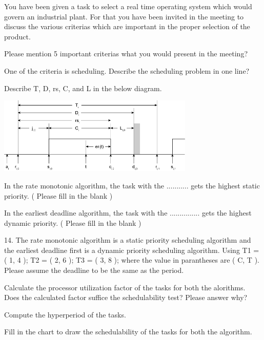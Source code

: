 \pagebreak


You have been given a task to select a real time operating system which would govern an industrial plant. For that you have been invited in the meeting to discuss the various criterias which are important in the proper selection of the product. 

\begin{unteraufgaben}

\item Please mention 5 important criterias what you would present in the meeting?

\item One of the criteria is scheduling. Describe the scheduling problem in one line?

\item Describe T, D, rs, C, and L in the below diagram.

\includegraphics[width=0.7\textwidth]{master-exam-2014/figure1}
 
\item In the rate monotonic algorithm, the task with the ........... gets the highest static priority. ( Please fill in the blank )

\item In the earliest deadline algorithm, the task with the ............... gets the highest dynamic priority. ( Please fill in the blank )

\end{unteraufgaben}

\pagebreak



14.	The rate monotonic algorithm is a static priority scheduling algorithm and the earliest deadline first is a dynamic priority scheduling algorithm. Using T1 = ( 1, 4 ); T2 = ( 2, 6 ); T3 = ( 3, 8 ); where the value in parantheses are ( C, T ). Please assume the deadline to be the same as the period.

\begin{unteraufgaben}

\item	Calculate the processor utilization factor of the tasks for both the alorithms. Does the calculated factor suffice the schedulability test? Please answer why?
\item	Compute the hyperperiod of the tasks. 
\item	Fill in the chart to draw the schedulability of the tasks for both the algorithm.

\end{unteraufgaben}

